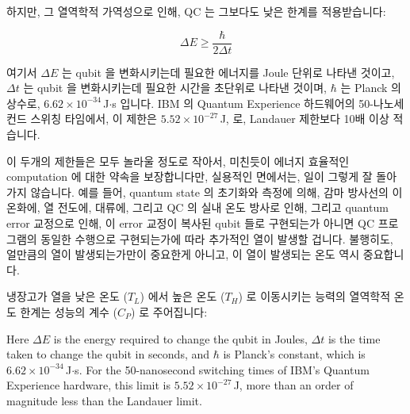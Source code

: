 하지만, 그 열역학적 가역성으로 인해, QC 는 그보다도 낮은 한계를 적용받습니다:

\begin{equation}
	\Delta E \geq \frac{\hbar}{2 \Delta t}
\end{equation}

여기서 $\Delta E$ 는 qubit 을 변화시키는데 필요한 에너지를 Joule 단위로 나타낸
것이고, $\Delta t$ 는 qubit 을 변화시키는데 필요한 시간을 초단위로 나타낸
것이며, $\hbar$ 는 Planck 의 상수로, $6.62 \times 10^{-34}$\,J$\cdot$s 입니다.
IBM 의 Quantum Experience 하드웨어의 50-나노세컨드 스위칭 타임에서, 이 제한은
$5.52 \times 10^{-27}$\,J, 로, Landauer 제한보다 10배 이상 적습니다.

이 두개의 제한들은 모두 놀라울 정도로 작아서, 미친듯이 에너지 효율적인
computation 에 대한 약속을 보장합니다만, 실용적인 면에서는, 일이 그렇게 잘
돌아가지 않습니다.
예를 들어, quantum state 의 초기화와 측정에 의해, 감마 방사선의 이온화에, 열
전도에, 대류에, 그리고 QC 의 실내 온도 방사로 인해, 그리고 quantum error
교정으로 인해, 이 error 교정이 복사된 qubit 들로 구현되는가 아니면 QC
프로그램의 동일한 수행으로 구현되는가에 따라 추가적인 열이 발생할 겁니다.
불행히도, 얼만큼의 열이 발생되는가만이 중요한게 아니고, 이 열이 발생되는 온도
역시 중요합니다.

냉장고가 열을 낮은 온도 ($T_L$) 에서 높은 온도 ($T_H$) 로 이동시키는 능력의
열역학적 온도 한계는 성능의 계수 ($C_P$) 로 주어집니다:
\iffalse

Here $\Delta E$ is the energy required to change the qubit in Joules,
$\Delta t$ is the time taken to change the qubit in seconds, and
$\hbar$ is Planck's constant, which is $6.62 \times 10^{-34}$\,J$\cdot$s.
For the 50-nanosecond switching times of IBM's Quantum Experience
hardware, this limit is $5.52 \times 10^{-27}$\,J, more than an order
of magnitude less than the Landauer limit.

